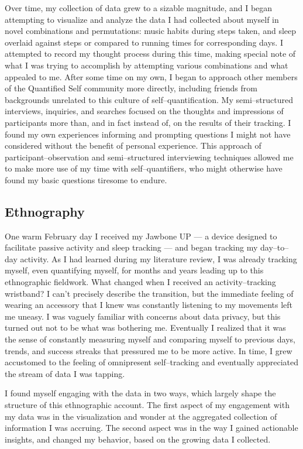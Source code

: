 \documentclass{article}
\begin{document}
Over time,
my collection of data grew to a sizable magnitude,
and I began attempting to visualize and analyze the data I had collected about myself in novel combinations and permutations:
music habits during steps taken,
and sleep overlaid against steps or compared to running times for corresponding days.
I attempted to record my thought process during this time,
making special note of what I was trying to accomplish by attempting various combinations and what appealed to me.
After some time on my own,
I began to approach other members of the Quantified Self community more directly,
including friends from backgrounds unrelated to this culture of self--quantification.
My semi--structured interviews,
inquiries,
and searches focused on the thoughts and impressions of participants more than,
and in fact instead of,
on the results of their tracking.
I found my own experiences informing and prompting questions I might not have considered without the benefit of personal experience.
This approach of participant--observation and semi--structured interviewing techniques allowed me to make more use of my time with self--quantifiers,
who might otherwise have found my basic questions tiresome to endure.

\subsection*{Ethnography}
One warm February day I received my Jawbone UP
--- a device designed to facilitate passive activity and sleep tracking ---
and began tracking my day--to--day activity.
As I had learned during my literature review,
I was already tracking myself,
even quantifying myself,
for months and years leading up to this ethnographic fieldwork.
What changed when I received an activity--tracking wristband? I can't precisely describe the transition,
but the immediate feeling of wearing an accessory that I knew was constantly listening to my movements left me uneasy.
I was vaguely familiar with concerns about data privacy,
but this turned out not to be what was bothering me.
Eventually I realized that it was the sense of constantly measuring myself and comparing myself to previous days,
trends,
and success streaks that pressured me to be more active.
In time,
I grew accustomed to the feeling of omnipresent self--tracking and eventually appreciated the stream of data I was tapping.

I found myself engaging with the data in two ways,
which largely shape the structure of this ethnographic account.
The first aspect of my engagement with my data was in the visualization and wonder at the aggregated collection of information I was accruing.
The second aspect was in the way I gained actionable insights,
and changed my behavior,
based on the growing data I collected.
\end{document}

